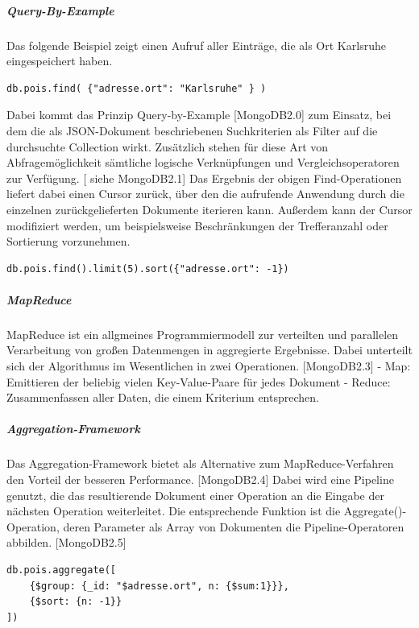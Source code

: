 \subparagraph{Query-By-Example}
Das folgende Beispiel zeigt einen Aufruf aller Einträge, die als Ort Karlsruhe eingespeichert haben. 
\newline
\begin{lstlisting}[caption=MongoDB Read, label=lst:MongoDBRead]
db.pois.find( {"adresse.ort": "Karlsruhe" } )
\end{lstlisting}

Dabei kommt das Prinzip Query-by-Example [MongoDB2.0] zum Einsatz, bei dem die als JSON-Dokument beschriebenen Suchkriterien als Filter auf die durchsuchte Collection wirkt. Zusätzlich stehen für diese Art von Abfragemöglichkeit sämtliche logische Verknüpfungen und Vergleichsoperatoren zur Verfügung.  [ siehe MongoDB2.1]
Das Ergebnis der obigen Find-Operationen liefert dabei einen Cursor zurück, über den die aufrufende Anwendung durch die einzelnen zurückgelieferten Dokumente iterieren kann. Außerdem kann der Cursor modifiziert werden, um beispielsweise Beschränkungen der Trefferanzahl oder Sortierung vorzunehmen.
\newline
\begin{lstlisting}[caption=MongoDB Read Modifikation, label=lst:MongoDBReadModifikation]
db.pois.find().limit(5).sort({"adresse.ort": -1})
\end{lstlisting}

\subparagraph{MapReduce}
MapReduce ist ein allgmeines Programmiermodell zur verteilten und parallelen Verarbeitung von großen Datenmengen in aggregierte Ergebnisse. Dabei unterteilt sich der Algorithmus im Wesentlichen in zwei Operationen. [MongoDB2.3]
\newline
-	Map: Emittieren der beliebig vielen Key-Value-Paare für jedes Dokument
\newline
-	Reduce: Zusammenfassen aller Daten, die einem Kriterium entsprechen.

\subparagraph{Aggregation-Framework}
Das Aggregation-Framework bietet als Alternative zum MapReduce-Verfahren den Vorteil der besseren Performance. [MongoDB2.4] Dabei wird eine Pipeline genutzt, die das resultierende Dokument einer Operation an die Eingabe der nächsten Operation weiterleitet. Die entsprechende Funktion ist die Aggregate()-Operation, deren Parameter als Array von Dokumenten die Pipeline-Operatoren abbilden. [MongoDB2.5]
\newline 

\begin{lstlisting}[caption=MongoDB Aggregate, label=lst:MongoDBAggregate]
db.pois.aggregate([
    {$group: {_id: "$adresse.ort", n: {$sum:1}}},
    {$sort: {n: -1}}
])
\end{lstlisting}


